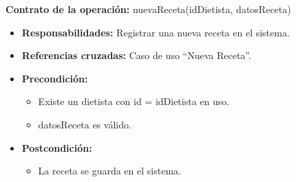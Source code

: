 \textbf{Contrato de la operación:} nuevaReceta(idDietista, datosReceta)
\begin{itemize}
\item \textbf{Responsabilidades:} Registrar una nueva receta en el sistema.
\item \textbf{Referencias cruzadas:} Caso de uso ``Nueva Receta''.
\item \textbf{Precondición:}
\begin{itemize}
\item Existe un dietista con id = idDietista en uso.
\item datosReceta es válido.
\end{itemize}
\item \textbf{Postcondición:}
\begin{itemize}
\item La receta se guarda en el sistema.
\end{itemize}
\end{itemize}

